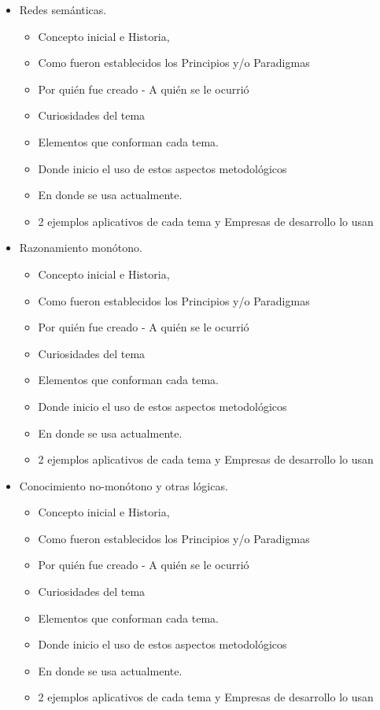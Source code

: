 \documentclass[12pt]{article}
\begin{document}
\begin{itemize}
\item Redes semánticas.
    \begin{itemize}
\item Concepto inicial e Historia,
\item Como fueron establecidos los Principios y/o Paradigmas
\item Por quién fue creado - A quién se le ocurrió
\item Curiosidades del tema
\item Elementos que conforman cada tema.
\item Donde inicio el uso de estos aspectos metodológicos
	\item En donde se usa actualmente.
\item 2 ejemplos aplicativos de cada tema y
Empresas de desarrollo lo usan
    \end{itemize}

\item Razonamiento monótono.
    \begin{itemize}
\item Concepto inicial e Historia,
\item Como fueron establecidos los Principios y/o Paradigmas
\item Por quién fue creado - A quién se le ocurrió
\item Curiosidades del tema
\item Elementos que conforman cada tema.
\item Donde inicio el uso de estos aspectos metodológicos
	\item En donde se usa actualmente.
\item 2 ejemplos aplicativos de cada tema y
Empresas de desarrollo lo usan
    \end{itemize}

\item Conocimiento no-monótono y otras lógicas.
    \begin{itemize}
\item Concepto inicial e Historia,
\item Como fueron establecidos los Principios y/o Paradigmas
\item Por quién fue creado - A quién se le ocurrió
\item Curiosidades del tema
\item Elementos que conforman cada tema.
\item Donde inicio el uso de estos aspectos metodológicos
	\item En donde se usa actualmente.
\item 2 ejemplos aplicativos de cada tema y
Empresas de desarrollo lo usan
    \end{itemize}


\end{itemize}
\end{document}
